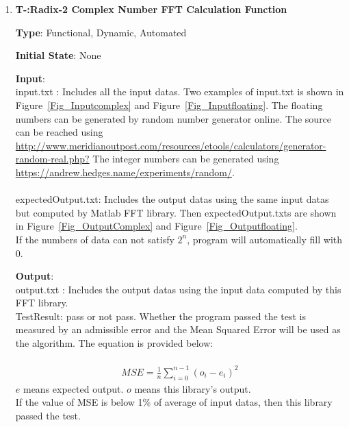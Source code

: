 \documentclass[12pt, titlepage]{article}
\newcounter{tnum}
\begin{document}
\begin{enumerate}

\item{\textbf{T-\thetnum \label{R2CFFT}:Radix-2 Complex Number FFT Calculation Function}}

\textbf {Type}: Functional, Dynamic, Automated
					
\textbf {Initial State}: None
					
\textbf {Input}:\\{\large input.txt} :  Includes all the input datas. Two examples of input.txt is shown in Figure~\ref{Fig_Inputcomplex} and Figure~\ref{Fig_Inputfloating}. The floating numbers can be generated by random number generator online. The source can be reached using    \url  {http://www.meridianoutpost.com/resources/etools/calculators/generator-random-real.php?} The integer numbers can be generated using \url {https://andrew.hedges.name/experiments/random/}.\\\\ 
{\large expectedOutput.txt}:  Includes the output datas using the same input datas but computed by Matlab FFT library. Then expectedOutput.txts  are shown in Figure~\ref{Fig_OutputComplex} and Figure~\ref{Fig_Outputfloating}. \\ 
If the numbers of data can not satisfy $2^n$, program will
automatically fill with 0.\\  
					
\textbf {Output}: \\{\large output.txt} : Includes the output datas using the input data computed by this FFT library.\\
{\large TestResult}: pass or not pass. Whether the program passed the test is measured by an admissible error and the Mean Squared Error will be used as the algorithm. The equation is provided below:\\\\
\begin{gather}
MSE = \frac{1}{n}\sum_{i=0}^{n-1} (o_i - e_i)^2
\end{gather}
$e$ means expected output. $o$ means this library's output.  \\
If the value of MSE is below 1\% of average of input datas, then this library passed the test.


\end{enumerate}
\end{document}

